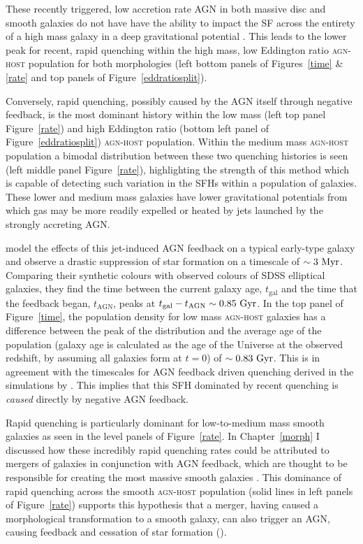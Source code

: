 These recently triggered, low accretion rate AGN in both massive disc and smooth galaxies do not have have the ability to impact the SF across the entirety of a high mass galaxy in a deep gravitational potential \citep{ishibashi12, Zinn13}. This leads to the lower peak for recent, rapid quenching within the high mass, low Eddington ratio \textsc{agn-host} population for both morphologies (left bottom panels of Figures~\ref{time} \& \ref{rate} and top panels of Figure~\ref{eddratiosplit}). 

Conversely, rapid quenching, possibly caused by the AGN itself through negative feedback, is the most dominant history within the low mass (left top panel Figure~\ref{rate}) and high Eddington ratio (bottom left panel of Figure~\ref{eddratiosplit}) \textsc{agn-host} population. Within the medium mass \textsc{agn-host} population a bimodal distribution between these two quenching histories is seen (left middle panel Figure~\ref{rate}), highlighting the strength of this method which is capable of detecting such variation in the SFHs within a population of galaxies. These lower and medium mass galaxies have lower gravitational potentials from which gas may be more readily expelled or heated \citep{tortora09} by jets launched by the strongly accreting AGN. 

\cite{tortora09} model the effects of this jet-induced AGN feedback on a typical early-type galaxy and observe a drastic suppression of star formation on a timescale of $\sim 3 ~\rm{Myr}$. Comparing their synthetic colours with observed colours of SDSS elliptical galaxies, they find the time between the current galaxy age, $t_\mathrm{gal}$ and the time that the feedback began, $t_\mathrm{AGN}$, peaks at $t_\mathrm{gal} - t_\mathrm{AGN} \sim 0.85 ~\rm{Gyr}$. In the top panel of Figure~\ref{time}, the population density for low mass \textsc{agn-host} galaxies has a difference between the peak of the distribution and the average age of the population (galaxy age is calculated as the age of the Universe at the observed redshift, by assuming all galaxies form at $t=0$) of $\sim0.83 ~\rm{Gyr}$. This is in agreement with the timescales for AGN feedback driven quenching derived in the simulations by \citet{tortora09}. This implies that this SFH dominated by recent quenching is \emph{caused} directly by negative AGN feedback.

Rapid quenching is particularly dominant for low-to-medium mass smooth galaxies as seen in the level panels of Figure~\ref{rate}. In Chapter~\ref{morph} I discussed how these incredibly rapid quenching rates could be attributed to mergers of galaxies in conjunction with AGN feedback, which are thought to be responsible for creating the most massive smooth galaxies \citep{conselice03b, springel05b, hopkins08b}. This dominance of rapid quenching across the smooth \textsc{agn-host} population (solid lines in left panels of Figure~\ref{rate}) supports this hypothesis that a merger, having caused a morphological transformation to a smooth galaxy, can also trigger an AGN, causing feedback and cessation of star formation (\citealt{Sanders88, pontzen16}).


